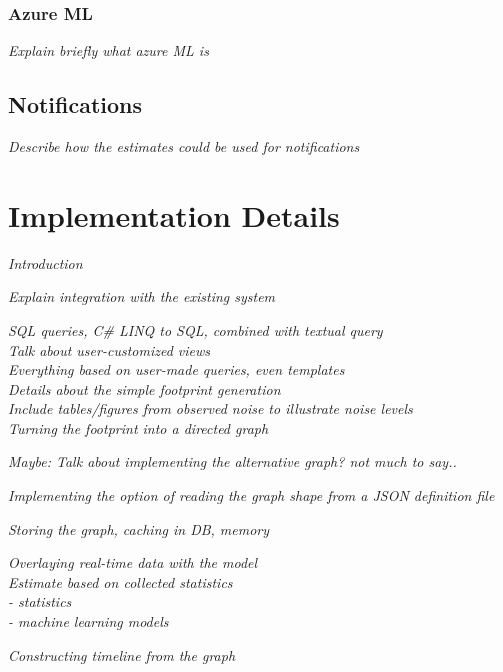 \documentclass[english,12pt,a4paper,pdftex,sci,utf8]{aaltothesis}
\theoremstyle{definition}
\newcommand{\nyi}[1]{\noindent\colorbox{nyibg}{\textcolor{nyitext}{\emph{#1}}}}
\begin{document}
\subsubsection{Azure ML}
\nyi{Explain briefly what azure ML is}

\subsection{Notifications}
\nyi{Describe how the estimates could be used for notifications}



\clearpage
\section{Implementation Details}

\nyi{Introduction}

\nyi{Explain integration with the existing system}

\nyi{SQL queries, C\# LINQ to SQL, combined with textual query}\\
\nyi{Talk about user-customized views}\\
\nyi{Everything based on user-made queries, even templates}\\

\nyi{Details about the simple footprint generation}\\
\nyi{Include tables/figures from observed noise to illustrate noise levels}\\

\nyi{Turning the footprint into a directed graph}

\nyi{Maybe: Talk about implementing the alternative graph? not much to say..}

\nyi{Implementing the option of reading the graph shape from a JSON definition file}

\nyi{Storing the graph, caching in DB, memory}

\nyi{Overlaying real-time data with the model}\\

\nyi{Estimate based on collected statistics}\\
\nyi{ - statistics}\\
\nyi{ - machine learning models}

\nyi{Constructing timeline from the graph}\\
\end{document}
